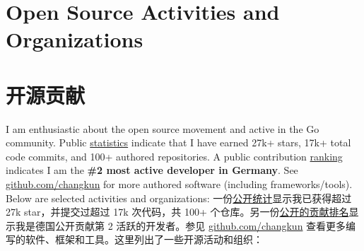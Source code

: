  {
  \section{\textbf{Open Source Activities and Organizations}}
}{
  \section{\textbf{开源贡献}}
}
\small
{} {
  I am enthusiastic about the open source movement and active in the Go community. Public \href{https://github-readme-stats.vercel.app/api?username=changkun&include_all_commits=true}{statistics} indicate that I have earned 27k+ stars, 17k+ total code commits, and 100+ authored repositories. A public contribution \href{https://committers.top/germany}{ranking} indicates I am the \textbf{\#2 most active developer in Germany}. See \href{https://github.com/changkun}{github.com/changkun} for more authored software (including frameworks/tools). Below are selected activities and organizations:
}{
  一份\href{https://github-readme-stats.vercel.app/api?username=changkun&include_all_commits=true}{公开统计}显示我已获得超过 27k star，并提交过超过 17k 次代码，共 100+ 个仓库。另一份\href{https://committers.top/germany}{公开的贡献排名}显示我是德国公开贡献第 2 活跃的开发者。参见 \href{https://github.com/changkun}{github.com/changkun} 查看更多编写的软件、框架和工具。这里列出了一些开源活动和组织：
}
